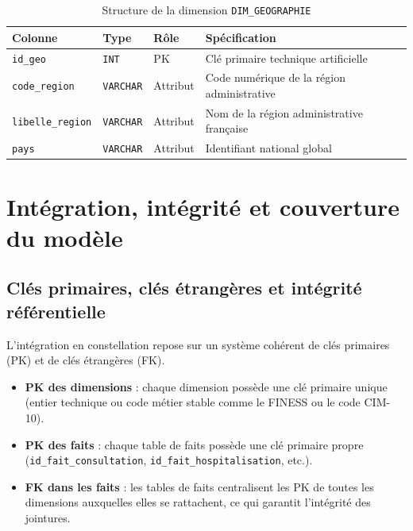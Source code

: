 \documentclass[12pt, a4paper]{report}
\newcommand{\code}[1]{\texttt{#1}}
\begin{document}
\begin{itemize}[label=\textcolor{chuBlue}{\textbullet}]
\begin{table}[htbp]
\centering\footnotesize\renewcommand{\arraystretch}{1.4}
\begin{tabularx}{\linewidth}{@{} L{3.0cm} L{1.5cm} L{1.8cm} X @{}}
\toprule
{}
\textbf{Colonne} & \textbf{Type} & \textbf{Rôle} & \textbf{Spécification} \\
\midrule
\texttt{id\_geo} & \texttt{INT} & PK & Clé primaire technique artificielle \\
\texttt{code\_region} & \texttt{VARCHAR} & Attribut & Code numérique de la région administrative \\
\texttt{libelle\_region} & \texttt{VARCHAR} & Attribut & Nom de la région administrative française \\
\texttt{pays} & \texttt{VARCHAR} & Attribut & Identifiant national global \\
\bottomrule
\end{tabularx}
\caption{Structure de la dimension \texttt{DIM\_GEOGRAPHIE}}
\label{tab:dim_geo}
\end{table}

\clearpage

\section{Intégration, intégrité et couverture du modèle}

\subsection{Clés primaires, clés étrangères et intégrité référentielle}

L’intégration en constellation repose sur un système cohérent de clés primaires (PK) et de clés étrangères (FK). 

\begin{itemize}[label=\textcolor{chuBlue}{\textbullet}]
  \item \textbf{PK des dimensions} : chaque dimension possède une clé primaire unique (entier technique ou code métier stable comme le FINESS ou le code CIM-10).
  \item \textbf{PK des faits} : chaque table de faits possède une clé primaire propre (\code{id\_fait\_consultation}, \code{id\_fait\_hospitalisation}, etc.).
  \item \textbf{FK dans les faits} : les tables de faits centralisent les PK de toutes les dimensions auxquelles elles se rattachent, ce qui garantit l’intégrité des jointures.
\end{itemize}


\end{itemize}
\end{document}
